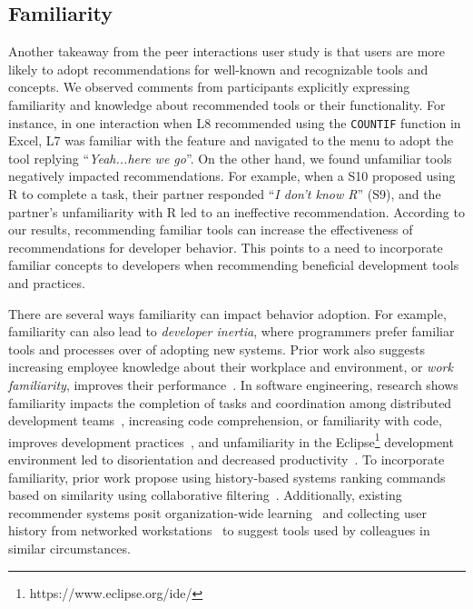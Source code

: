 \subsection{Familiarity}

Another takeaway from the peer interactions user study is that users are more likely to adopt recommendations for well-known and recognizable tools and concepts. We observed comments from participants explicitly expressing familiarity and knowledge about recommended tools or their functionality. For instance, in one interaction when L8 recommended using the \texttt{COUNTIF} function in Excel, L7 was familiar with the feature and navigated to the menu to adopt the tool replying ``\textit{Yeah...here we go}''. On the other hand, we found unfamiliar tools negatively impacted recommendations. For example, when a S10 proposed using R to complete a task, their partner responded ``\textit{I don’t know R}'' (S9), and the partner's unfamiliarity with R led to an ineffective recommendation. According to our results, recommending familiar tools can increase the effectiveness of recommendations for developer behavior. This points to a need to incorporate familiar concepts to developers when recommending beneficial development tools and practices.

There are several ways familiarity can impact behavior adoption. For example, familiarity can also lead to \textit{developer inertia}, where programmers prefer familiar tools and processes over of adopting new systems. Prior work also suggests increasing employee knowledge about their workplace and environment, or \textit{work familiarity}, improves their performance~\cite{goodman1992familiarity}. In software engineering, research shows familiarity impacts the completion of tasks and coordination among distributed development teams~\cite{espinosa2002shared}, increasing code comprehension, or familiarity with code, improves development practices~\cite{ko2006exploratory}, and unfamiliarity in the Eclipse\footnote{https://www.eclipse.org/ide/} development environment led to disorientation and decreased productivity~\cite{de2006using}. To incorporate familiarity, prior work propose using history-based systems ranking commands based on similarity using collaborative filtering~\cite{Murphy-Hill2012Fluency}. Additionally, existing recommender systems posit organization-wide learning~\cite{linton2000owl} and collecting user history from networked workstations~\cite{ToolBox} to suggest tools used by colleagues in similar circumstances.

